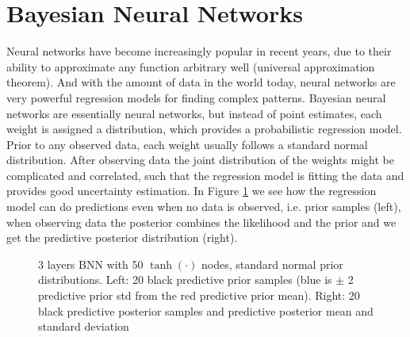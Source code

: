 \section{Bayesian Neural Networks}\label{BNN} 

Neural networks have become increasingly popular in recent years, due to their ability to
approximate any function arbitrary well (universal approximation theorem). And with the amount of
data in the world today, neural networks are very powerful regression models for finding complex
patterns. Bayesian neural networks are essentially neural networks, but instead of point estimates,
each weight is assigned a distribution, which provides a probabilistic regression model. Prior to
any observed data, each weight usually follows a standard normal distribution. After observing data
the joint distribution of the weights might be complicated and correlated, such that the regression
model is fitting the data and provides good uncertainty estimation. In Figure
\ref{BNN_prior_posterior} we see how the regression model can do predictions even when no data is
observed, i.e. prior samples (left), when observing data the posterior combines the likelihood and
the prior and we get the predictive posterior distribution (right).
\begin{figure}[H]
    \qquad
    \caption{3 layers BNN with 50 $\tanh(\cdot)$ nodes, standard normal prior distributions. 
    Left: 20 black predictive prior samples (blue is $\pm$ 2 predictive prior std from the red predictive prior mean). Right: 
    20 black predictive posterior samples and predictive posterior mean and standard deviation}%
    \label{BNN_prior_posterior}%
\end{figure}

